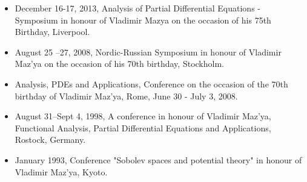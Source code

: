 \documentclass{article}
\begin{document}
\medskip


\begin{itemize}
\item December 16-17, 2013, Analysis of Partial Differential Equations - Symposium in honour of  Vladimir Mazya on the occasion of his 75th Birthday, Liverpool.
\item  August 25 --27, 2008, Nordic-Russian Symposium in honour of Vladimir Maz'ya on the occasion of his 70th birthday, Stockholm.
\item Analysis, PDEs and Applications, Conference on the occasion of the 70th birthday of Vladimir Maz'ya, Rome, June 30 - July 3, 2008.
       \item August 31--Sept 4, 1998,  A
conference in honour of Vladimir
  Maz'ya, Functional Analysis, Partial Differential Equations and
  Applications, Rostock, Germany.
\item January 1993, Conference "Sobolev spaces and potential theory" in honour of Vladimir Maz'ya, Kyoto.
\end{itemize}



\medskip

\end{document}
